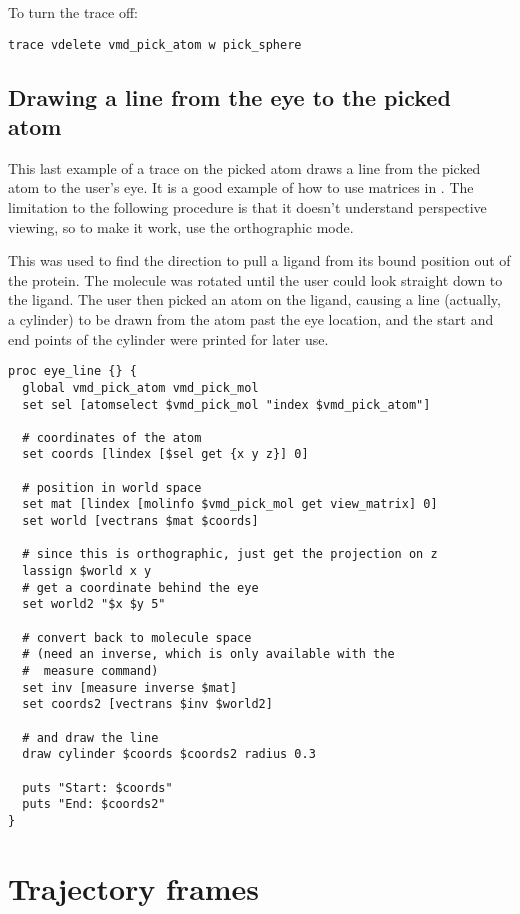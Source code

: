 To turn the trace off:

\begin{verbatim}
trace vdelete vmd_pick_atom w pick_sphere
\end{verbatim}


\subsection{Drawing a line from the eye to the picked atom}

This last example of a trace on the picked atom draws a line from the
picked atom to the user's eye.  It is a good example of how to use
matrices in \VMD.  The limitation to the following procedure is that
it doesn't understand perspective viewing, so to make it work, use the
orthographic mode.

  This was used to find the direction to pull a ligand from its bound
position out of the protein.  The molecule was rotated until the user
could look straight down to the ligand.  The user then picked an atom
on the ligand, causing a line (actually, a cylinder) 
to be drawn from the atom past the eye location,
and the start and end points of the cylinder were printed for
later use.

\begin{verbatim}
proc eye_line {} {
  global vmd_pick_atom vmd_pick_mol
  set sel [atomselect $vmd_pick_mol "index $vmd_pick_atom"]

  # coordinates of the atom
  set coords [lindex [$sel get {x y z}] 0]

  # position in world space
  set mat [lindex [molinfo $vmd_pick_mol get view_matrix] 0]
  set world [vectrans $mat $coords]

  # since this is orthographic, just get the projection on z
  lassign $world x y
  # get a coordinate behind the eye
  set world2 "$x $y 5"

  # convert back to molecule space
  # (need an inverse, which is only available with the 
  #  measure command)
  set inv [measure inverse $mat]
  set coords2 [vectrans $inv $world2]

  # and draw the line
  draw cylinder $coords $coords2 radius 0.3

  puts "Start: $coords"
  puts "End: $coords2"
}
\end{verbatim}

\section{Trajectory frames}

